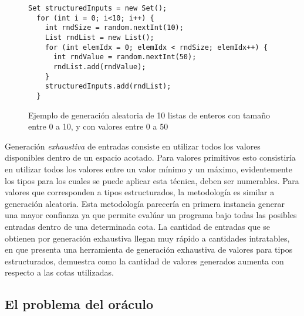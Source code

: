\begin{figure}
	\begin{lstlisting}[frame=single, mathescape=true,framexleftmargin=1.5em]
  Set structuredInputs = new Set();
  for (int i = 0; i<10; i++) {
    int rndSize = random.nextInt(10);
    List rndList = new List();
    for (int elemIdx = 0; elemIdx < rndSize; elemIdx++) {
      int rndValue = random.nextInt(50);
      rndList.add(rndValue);
    }
    structuredInputs.add(rndList);
  }
	\end{lstlisting}
	\caption{Ejemplo de generaci\'on aleatoria de 10 listas de enteros con tama\~no entre 0 a 10, y con valores entre 0 a 50}
	\label{figures.examples.testing.random.structure}
\end{figure}

Generaci\'on \emph{exhaustiva} de entradas consiste en utilizar todos los valores disponibles dentro de un espacio acotado. Para valores primitivos esto consistir\'ia en utilizar todos los valores entre un valor m\'inimo y un m\'aximo, evidentemente los tipos para los cuales se puede aplicar esta t\'ecnica, deben ser numerables. Para valores que corresponden a tipos estructurados, la metodolog\'ia es similar a generaci\'on aleatoria. Esta metodolog\'ia parecer\'ia en primera instancia generar una mayor confianza ya que permite eval\'uar un programa bajo todas las posibles entradas dentro de una determinada cota. La cantidad de entradas que se obtienen por generaci\'on exhaustiva llegan muy r\'apido a cantidades intratables, en \cite{bibliography.testing.generation.KoratBoyapatiKM02} que presenta una herramienta de generaci\'on exhaustiva de valores para tipos estructurados, demuestra como la cantidad de valores generados aumenta con respecto a las cotas utilizadas.


\subsection{El problema del or\'aculo}

